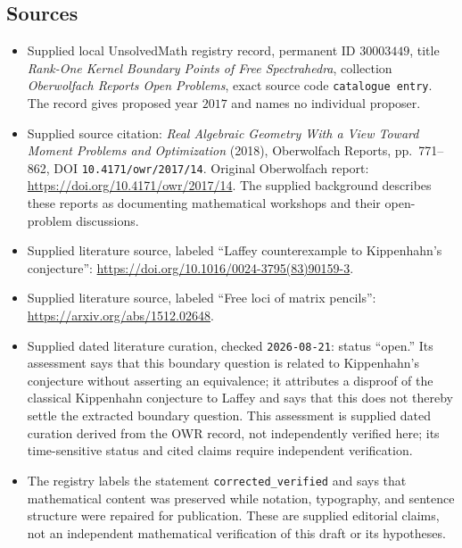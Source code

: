 \documentclass[11pt]{article}
\begin{document}
\subsection{Sources}
\begin{itemize}
\item Supplied local UnsolvedMath registry record, permanent ID \(30003449\), title \emph{Rank-One Kernel Boundary Points of Free Spectrahedra}, collection \emph{Oberwolfach Reports Open Problems}, exact source code \texttt{catalogue entry}. The record gives proposed year \(2017\) and names no individual proposer.
\item Supplied source citation: \emph{Real Algebraic Geometry With a View Toward Moment Problems and Optimization} (2018), Oberwolfach Reports, pp.\ 771--862, DOI \texttt{10.4171/owr/2017/14}. Original Oberwolfach report: \url{https://doi.org/10.4171/owr/2017/14}. The supplied background describes these reports as documenting mathematical workshops and their open-problem discussions.
\item Supplied literature source, labeled ``Laffey counterexample to Kippenhahn's conjecture'': \url{https://doi.org/10.1016/0024-3795(83)90159-3}.
\item Supplied literature source, labeled ``Free loci of matrix pencils'': \url{https://arxiv.org/abs/1512.02648}.
\item Supplied dated literature curation, checked \texttt{2026-08-21}: status ``open.'' Its assessment says that this boundary question is related to Kippenhahn's conjecture without asserting an equivalence; it attributes a disproof of the classical Kippenhahn conjecture to Laffey and says that this does not thereby settle the extracted boundary question. This assessment is supplied dated curation derived from the OWR record, not independently verified here; its time-sensitive status and cited claims require independent verification.
\item The registry labels the statement \texttt{corrected\_verified} and says that mathematical content was preserved while notation, typography, and sentence structure were repaired for publication. These are supplied editorial claims, not an independent mathematical verification of this draft or its hypotheses.
\end{itemize}
\end{document}
